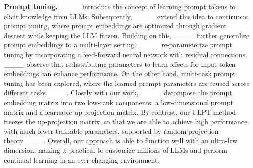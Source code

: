 \textbf{Prompt tuning.} 
____ introduce the concept of learning prompt tokens to elicit knowledge from LLMs. Subsequently, ____ extend this idea to continuous prompt tuning, where prompt embeddings are optimized through gradient descent while keeping the LLM frozen. Building on this, ____ further generalize prompt embeddings to a multi-layer setting. ____ re-parameterize prompt tuning by incorporating a feed-forward neural network with residual connections.  ____ observe that redistributing parameters to learn offsets for input token embeddings can enhance performance. On the other hand, multi-task prompt tuning has been explored, where the learned prompt parameters are reused across different tasks____. Closely with our work, ____ decompose the prompt embedding matrix into two low-rank components: a low-dimensional prompt matrix and a learnable up-projection matrix. By contrast, our ULPT method freezes the up-projection matrix, so that we are able to achieve high performance with much fewer trainable parameters, supported by random-projection theory____. Overall, our approach is able to function well with an ultra-low dimension, making it practical to customize millions of LLMs and perform continual learning in an ever-changing environment.